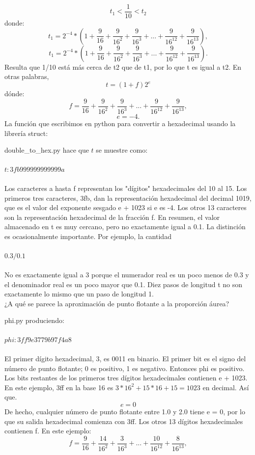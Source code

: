 \documentclass[12pt]{article}
\begin{document}
$$t_1 < \frac{1}{10} < t_2$$
donde:
$$t_1 = 2^{-4}*(1+\frac{9}{16}+\frac{9}{16^2}+\frac{9}{16^3}+...+\frac{9}{16^{12}}+\frac{9}{16^{13}}),$$
$$t_1 = 2^{-4}*(1+\frac{9}{16}+\frac{9}{16^2}+\frac{9}{16^3}+...+\frac{9}{16^{12}}+\frac{9}{16^{13}}).$$
Resulta que 1/10 está más cerca de t2 que de t1, por lo que t es igual a t2. En otras palabras,
$$t = (1+f)2^e$$
d\'onde:
$$f = \frac{9}{16}+\frac{9}{16^2}+\frac{9}{16^3}+...+\frac{9}{16^{12}}+\frac{9}{16^{13}},$$
$$e = -4.$$
La funci\'on que escribimos en python para convertir a hexadecimal usando la librer\'ia struct:

{double_to_hex.py}
hace que $t$ se muestre como:\\\\
$t: 3fb999999999999a$\\\\
Los caracteres a hasta f representan los "dígitos" hexadecimales del 10 al 15. Los primeros
tres caracteres, 3fb, dan la representación hexadecimal del decimal 1019, que es el valor del
exponente sesgado e + 1023 si e es -4. Los otros 13 caracteres son la representación
hexadecimal de la fracción f.
En resumen, el valor almacenado en t es muy cercano, pero no exactamente igual a 0.1. La
distinción es ocasionalmente importante. Por ejemplo, la cantidad\\\\
$0.3/0.1$\\\\
No es exactamente igual a 3 porque el numerador real es un poco menos de 0.3 y el
denominador real es un poco mayor que 0.1.
Diez pasos de longitud t no son exactamente lo mismo que un paso de longitud 1.\\
¿A qué se parece la aproximación de punto flotante a la proporción áurea?

{phi.py}
produciendo:\\\\
$phi: 3ff9e3779b97f4a8$\\\\
El primer dígito hexadecimal, 3, es 0011 en binario. El primer bit es el signo del número de
punto flotante; 0 es positivo, 1 es negativo. Entonces phi es positivo. Los bits restantes de los
primeros tres dígitos hexadecimales contienen e + 1023. En este ejemplo, 3ff en la base 16
es $3*16^2 + 15*16 + 15 = 1023$ en decimal. Así que.
$$e = 0$$
De hecho, cualquier número de punto flotante entre 1.0 y 2.0 tiene e = 0, por lo que su salida
hexadecimal comienza con 3ff. Los otros 13 dígitos hexadecimales contienen f. En este
ejemplo:
$$f = \frac{9}{16}+\frac{14}{16^2}+\frac{3}{16^3}+...+\frac{10}{16^{12}}+\frac{8}{16^{13}},$$
\end{document}
